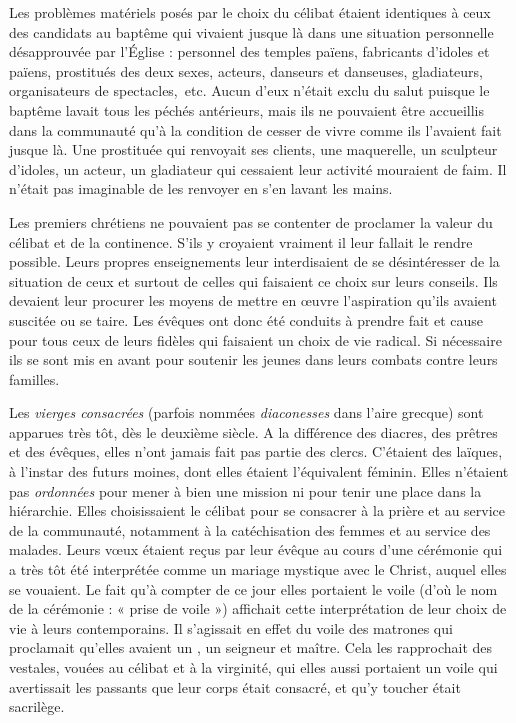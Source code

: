  Les problèmes matériels posés par le choix du célibat étaient identiques à ceux des candidats au baptême qui vivaient jusque là dans une situation personnelle désapprouvée par l'Église : personnel des temples païens, fabricants d'idoles et  païens, prostitués des deux sexes, acteurs, danseurs et danseuses, gladiateurs, organisateurs de spectacles,~etc. Aucun d'eux n'était exclu du salut puisque le baptême lavait tous les péchés antérieurs, mais ils ne pouvaient être accueillis dans la communauté qu'à la condition de cesser de vivre comme ils l'avaient fait jusque là. Une prostituée qui renvoyait ses clients, une maquerelle, un sculpteur d'idoles, un acteur, un gladiateur qui cessaient leur activité mouraient de faim. Il n'était pas imaginable de les renvoyer en s'en lavant les mains. 

 Les premiers chrétiens ne pouvaient pas se contenter de proclamer la valeur du célibat et de la continence. S'ils y croyaient vraiment il leur fallait le rendre possible. Leurs propres enseignements leur interdisaient de se désintéresser de la situation de ceux et surtout de celles qui faisaient ce choix sur leurs conseils. Ils devaient leur procurer les moyens de mettre en œuvre l'aspiration qu'ils avaient suscitée ou se taire. Les évêques ont donc été conduits à prendre fait et cause pour tous ceux de leurs fidèles qui faisaient un choix de vie radical. Si nécessaire ils se sont mis en avant pour soutenir les jeunes dans leurs combats contre leurs familles. 

 Les \emph{vierges consacrées} (parfois nommées \emph{diaconesses} dans l'aire grecque) sont apparues très tôt, dès le deuxième siècle. A la différence des diacres, des prêtres et des évêques, elles n'ont jamais fait pas partie des clercs. C'étaient des laïques, à l'instar des futurs moines, dont elles étaient l'équivalent féminin. Elles n'étaient pas \emph{ordonnées} pour mener à bien une mission ni pour tenir une place dans la hiérarchie. Elles choisissaient le célibat pour se consacrer à la prière et au service de la communauté, notamment à la catéchisation des femmes et au service des malades. Leurs vœux étaient reçus par leur évêque au cours d'une cérémonie qui a très tôt été interprétée comme un mariage mystique avec le Christ, auquel elles se vouaient. Le fait qu'à compter de ce jour elles portaient le voile (d'où le nom de la cérémonie : « prise de voile ») affichait cette interprétation de leur choix de vie à leurs contemporains. Il s'agissait en effet du voile des matrones qui proclamait qu'elles avaient un , un seigneur et maître. Cela les rapprochait des vestales, vouées au célibat et à la virginité, qui elles aussi portaient un voile qui avertissait les passants que leur corps était consacré, et qu'y toucher était sacrilège.


